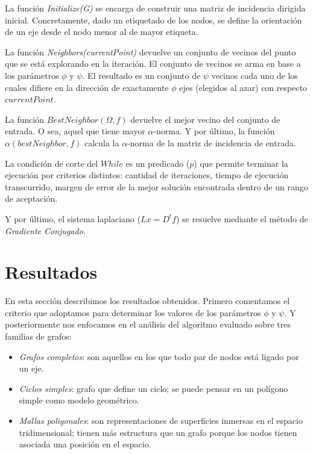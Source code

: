 \documentclass[conference,compsoc,a4paper]{IEEEtran}
\begin{document}
La función \emph{Initialize(G)} se encarga de construir 
una matriz de incidencia dirigida inicial. Concretamente,
dado un etiquetado de los nodos, se define la orientación de un eje
desde el nodo menor 
al de mayor etiqueta. 

\smallskip

La función \emph{Neighbors(currentPoint)} devuelve un conjunto de 
vecinos del punto que se está explorando en la iteración. El conjunto 
de vecinos se arma en base a los parámetros $\phi$ y $\psi$. El 
resultado es un conjunto de $\psi$ vecinos cada uno de los cuales 
difiere en la dirección de exactamente $\phi$ ejes (elegidos al azar) 
con respecto $currentPoint$.

\smallskip

La función $BestNeighbor(\Omega,f)$ devuelve el mejor vecino del conjunto 
de entrada. O sea, aquel que tiene mayor $\alpha$-norma. Y por último, 
la función $\alpha(bestNeighbor,f)$ calcula la $\alpha$-norma de la matriz 
de incidencia de entrada.

\smallskip

La condición de corte del $While$ es un predicado ($p$) que permite 
terminar la ejecución por criterios distintos: cantidad de iteraciones, 
tiempo de ejecución transcurrido, margen de error de la mejor solución 
encontrada dentro de un rango de aceptación.

\smallskip

Y por último, el sistema laplaciano ($Lx = D^t f$) se resuelve mediante 
el método de \emph{Gradiente Conjugado}.

\section{Resultados}

En esta sección describimos los resultados obtenidos. Primero 
comentamos el criterio que adoptamos para determinar los valores de los 
parámetros $\phi$ y $\psi$. Y posteriormente nos enfocamos en el 
análisis del algoritmo evaluado sobre tres familias de grafos: 

\begin{itemize}
	\item \emph{Grafos completos}: son aquellos en los que todo par de  
	nodos está ligado por un eje.
	\item \emph{Ciclos simples}: grafo que define un ciclo; se puede pensar en un polígono simple como modelo 
	geométrico.
	\item \emph{Mallas poligonales}: son representaciones de superficies 
	inmersas en el espacio tridimensional; tienen más estructura que un 
	grafo porque los nodos tienen asociada una posición en el espacio.
\end{itemize}
\end{document}
